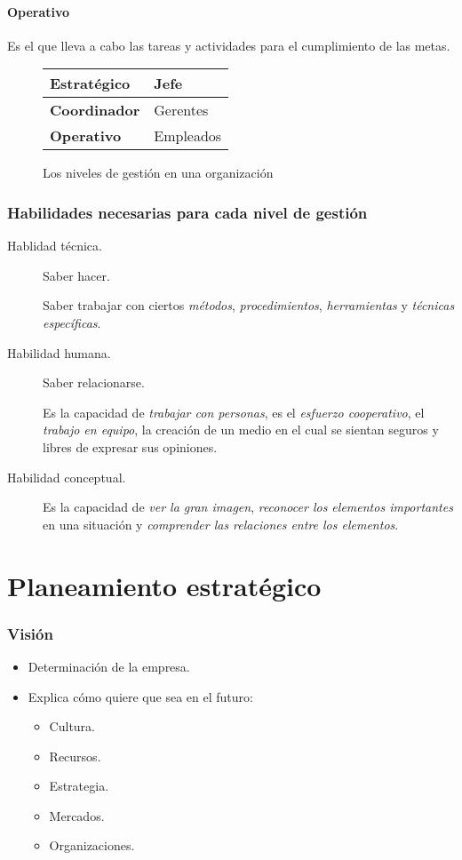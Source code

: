 \documentclass[10pt, spanish, a5paper]{article}
\begin{document}
\subsection{Operativo}

Es el que lleva a cabo las tareas y actividades para el cumplimiento de las metas.

\begin{figure}[h]
\centering
\begin{tabular}{ll}
	\midrule \textbf{Estratégico} & Jefe \\ 
	\midrule \textbf{Coordinador} & Gerentes \\ 
	\midrule \textbf{Operativo} & Empleados \\ 
	\midrule 
\end{tabular}
\caption{Los niveles de gestión en una organización}
\end{figure}

\section{Habilidades necesarias para cada nivel de gestión}

\begin{description}
	\item[Hablidad técnica.] Saber hacer.
	
	Saber trabajar con ciertos \emph{métodos}, \emph{procedimientos}, \emph{herramientas} y \emph{técnicas específicas}.
	
	\item[Habilidad humana.] Saber relacionarse.
	
	Es la capacidad de \emph{trabajar con personas}, es el \emph{esfuerzo cooperativo}, el \emph{trabajo en equipo}, la creación de un medio en el cual se sientan seguros y libres de expresar sus opiniones.

	\item[Habilidad conceptual.] Es la capacidad de \emph{ver la gran imagen}, \emph{reconocer los elementos importantes} en una situación y \emph{comprender las relaciones entre los elementos}.
\end{description}


\part{Planeamiento estratégico}

\section{Visión}
	\begin{itemize}
		\item Determinación de la empresa.
		\item Explica cómo quiere que sea en el futuro:
		\begin{itemize}
			\item Cultura.
			\item Recursos.
			\item Estrategia.
			\item Mercados.
			\item Organizaciones.
		\end{itemize}
	\end{itemize}
\end{document}
